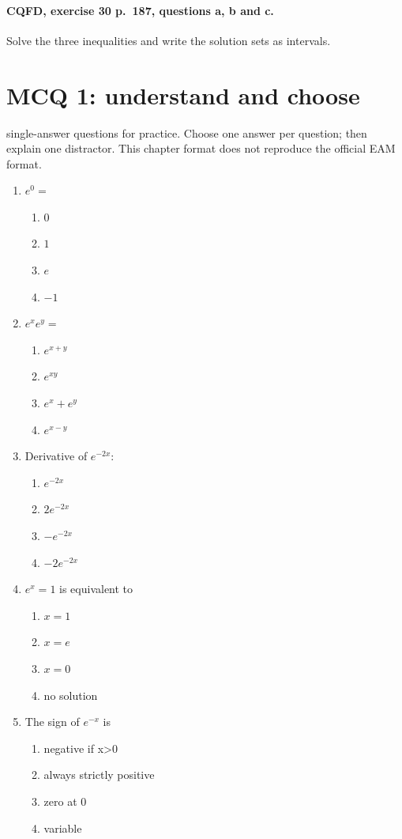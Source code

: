 \paragraph{CQFD, exercise 30 p.~187, questions a, b and c.}\label{C09-M2} Solve the three inequalities and write the solution sets as intervals.
\begingroup\small
\mxnewpage\section*{MCQ 1: understand and choose}\label{C09-Q1}
 single-answer questions for practice. Choose one answer per question; then explain one distractor. This chapter format does not reproduce the official EAM format.
\begin{enumerate}
\item $e^0=$
\begin{enumerate}[label=\Alph*.,itemsep=2pt]
\item $0$
\item $1$
\item $e$
\item $-1$
\end{enumerate}
\item $e^xe^y=$
\begin{enumerate}[label=\Alph*.,itemsep=2pt]
\item $e^{x+y}$
\item $e^{xy}$
\item $e^x+e^y$
\item $e^{x-y}$
\end{enumerate}
\item Derivative of $e^{-2x}$:
\begin{enumerate}[label=\Alph*.,itemsep=2pt]
\item $e^{-2x}$
\item $2e^{-2x}$
\item $-e^{-2x}$
\item $-2e^{-2x}$
\end{enumerate}
\item $e^x=1$ is equivalent to
\begin{enumerate}[label=\Alph*.,itemsep=2pt]
\item $x=1$
\item $x=e$
\item $x=0$
\item no solution
\end{enumerate}
\item The sign of $e^{-x}$ is
\begin{enumerate}[label=\Alph*.,itemsep=2pt]
\item negative if x>0
\item always strictly positive
\item zero at 0
\item variable
\end{enumerate}
\end{enumerate}
